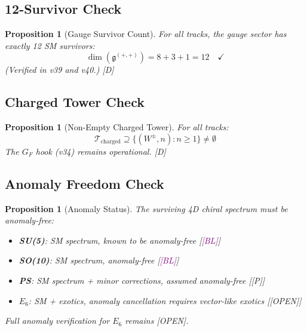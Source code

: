 \documentclass[11pt,a4paper]{article}
\newtheorem{proposition}[theorem]{Proposition}
\newcommand{\tagD}{\textcolor{blue!70!black}{[D]}}
\newcommand{\tagP}{\textcolor{green!50!black}{[P]}}
\newcommand{\tagBL}{\textcolor{purple}{[BL]}}
\newcommand{\tagOPEN}{\textcolor{red!70!black}{[OPEN]}}
\begin{document}
\subsection{12-Survivor Check}

\begin{proposition}[Gauge Survivor Count]
\label{prop:12-check}
For all tracks, the gauge sector has exactly 12 SM survivors:
\begin{equation}
\label{eq:12-verify}
\dim(\mathfrak{g}^{(+,+)}) = 8 + 3 + 1 = 12 \quad \checkmark
\end{equation}
(Verified in v39 and v40.) \tagD
\end{proposition}

\subsection{Charged Tower Check}

\begin{proposition}[Non-Empty Charged Tower]
\label{prop:charged-check}
For all tracks:
\begin{equation}
\label{eq:charged-verify}
\mathcal{T}_{\text{charged}} \supseteq \{(W^\pm, n) : n \geq 1\} \neq \emptyset
\end{equation}
The $G_F$ hook (v34) remains operational. \tagD
\end{proposition}

\subsection{Anomaly Freedom Check}

\begin{proposition}[Anomaly Status]
\label{prop:anomaly-check}
The surviving 4D chiral spectrum must be anomaly-free:
\begin{itemize}
    \item \textbf{SU(5)}: SM spectrum, known to be anomaly-free [\tagBL]
    \item \textbf{SO(10)}: SM spectrum, anomaly-free [\tagBL]
    \item \textbf{PS}: SM spectrum + minor corrections, assumed anomaly-free [\tagP]
    \item \textbf{$E_6$}: SM + exotics, anomaly cancellation requires vector-like exotics [\tagOPEN]
\end{itemize}
Full anomaly verification for $E_6$ remains \tagOPEN.
\end{proposition}

\end{document}
